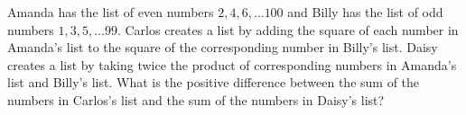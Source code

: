 Amanda has the list of even numbers $2, 4, 6, \dots 100$ and Billy has the list of odd numbers $1, 3, 5, \dots 99$. Carlos creates a list by adding the square of each number in Amanda's list to the square of the corresponding number in Billy's list. Daisy creates a list by taking twice the product of corresponding numbers in Amanda's list and Billy's list. What is the positive difference between the sum of the numbers in Carlos's list and the sum of the numbers in Daisy's list?
